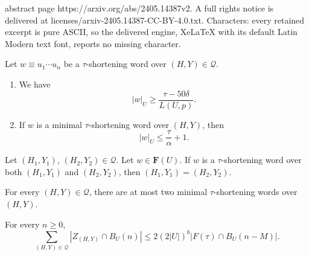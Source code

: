 \documentclass[10pt,a4paper]{amsart}
\newcommand{\F}{\mathbf{F}}
\newcommand{\scrQ}{\mathscr{Q}}
\begin{document}
abstract page https://arxiv.org/abs/2405.14387v2. A full rights notice is delivered at licenses/arxiv-2405.14387-CC-BY-4.0.txt. Characters: every retained excerpt is pure ASCII, so the delivered engine, XeLaTeX with its default Latin Modern text font, reports no missing character.
\begin{prop}
	
	\label{prop:shortening-bounds}
	
	Let $w\equiv u_1\cdots u_n$ be a $\tau$-shortening word over $(H,Y)\in\scrQ$. 
	\begin{enumerate}[label=(\roman*)]
		\item We have
		$$|w|_U\ge \frac{\tau-50\delta}{L(U,p)}.$$
		\item If $w$ is a minimal $\tau$-shortening word over $(H,Y)$, then
		$$|w|_U\le \frac{\tau}{\alpha}+1.$$
	\end{enumerate}
\end{prop}

\begin{prop}
	
	\label{prop:shortening-fellow-travelling}
	
	Let $(H_1,Y_1)$, $(H_2,Y_2)\in\scrQ$. Let $w\in \F(U)$. If $w$ is a $\tau$-shortening word over both $(H_1,Y_1)$ and $(H_2,Y_2)$, then $(H_1,Y_1)=(H_2,Y_2)$.
\end{prop}

\begin{prop}
	\label{prop:shortening-proper-prefix}
	For every $(H,Y)\in \scrQ$, there are at most two minimal $\tau$-shortening words over $(H,Y)$.
\end{prop}

\begin{lem}
	\label{lem:growth shortening-free 3}
	For every $n\ge 0$,
	$$\sum_{(H,Y)\in\scrQ}|Z_{(H,Y)}\cap B_U(n)|\le 2(2|U|)^{b}|F(\tau)\cap B_U(n-M)|.$$
\end{lem}
\end{document}
